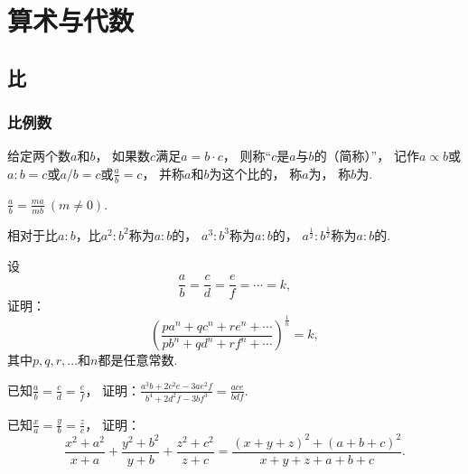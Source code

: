\chapter{算术与代数}

\section{比}
\subsection{比例数}
\begin{definition}
给定两个数\(a\)和\(b\)，
如果数\(c\)满足\(a=b \cdot c\)，
则称“\(c\)是\(a\)与\(b\)的（简称）”，
记作\(a \propto b\)或\(a:b=c\)或\(a/b=c\)或\(\frac{a}{b}=c\)，
并称\(a\)和\(b\)为这个比的，
称\(a\)为，
称\(b\)为.
\end{definition}

\begin{property}
\(\frac{a}{b} = \frac{ma}{mb}\ (m\neq0)\).
\end{property}

\begin{definition}
相对于比\(a:b\)，比\(a^2:b^2\)称为\(a:b\)的，
\(a^3:b^3\)称为\(a:b\)的，
\(a^{\frac{1}{2}}:b^{\frac{1}{2}}\)称为\(a:b\)的.
\end{definition}

\begin{example}
设\begin{equation*}
	\frac{a}{b} = \frac{c}{d} = \frac{e}{f} = \dotsb = k,
\end{equation*}
证明：\begin{equation*}
	\left(
		\frac{
			p a^n + q c^n + r e^n + \dotsb
		}{
			p b^n + q d^n + r f^n + \dotsb
		}
	\right)^{\frac1n} = k,
\end{equation*}
其中\(p,q,r,\dotsc\)和\(n\)都是任意常数.
\end{example}

\begin{example}
已知\(\frac{a}{b}=\frac{c}{d}=\frac{e}{f}\)，
证明：\(\frac{a^3b+2c^2e-3ae^2f}{b^4+2d^2f-3bf^3} = \frac{ace}{bdf}\).
\end{example}

\begin{example}
已知\(\frac{x}{a}=\frac{y}{b}=\frac{z}{c}\)，
证明：\begin{equation*}
	\frac{x^2+a^2}{x+a}+\frac{y^2+b^2}{y+b}+\frac{z^2+c^2}{z+c}
	= \frac{(x+y+z)^2+(a+b+c)^2}{x+y+z+a+b+c}.
\end{equation*}
\end{example}

